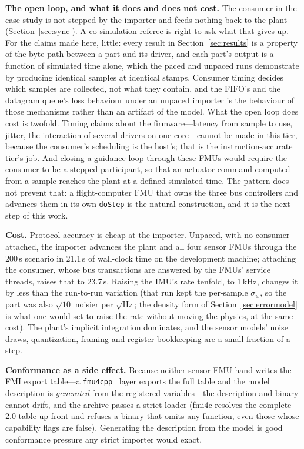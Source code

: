 \documentclass[preprint,12pt,a4paper]{elsarticle}
\newcommand{\code}[1]{\texttt{\small #1}}
\begin{document}
\textbf{The open loop, and what it does and does not cost.} The consumer in
the case study is not stepped by the importer and feeds nothing back to the
plant (Section~\ref{sec:sync}). A co-simulation referee is right to ask what
that gives up. For the claims made here, little: every result in
Section~\ref{sec:results} is a property of the byte path between a part and its
driver, and each part's output is a function of simulated time alone, which the
paced and unpaced runs demonstrate by producing identical samples at identical
stamps. Consumer timing decides which samples are collected, not what they
contain, and the FIFO's and the datagram queue's loss behaviour under an
unpaced importer is the behaviour of those mechanisms rather than an artifact
of the model. What the open loop does cost is twofold. Timing claims about the
firmware---latency from sample to use, jitter, the interaction of several
drivers on one core---cannot be made in this tier, because the consumer's
scheduling is the host's; that is the instruction-accurate tier's job. And
closing a guidance loop through these FMUs would require the consumer to be a
stepped participant, so that an actuator command computed from a sample reaches
the plant at a defined simulated time. The pattern does not prevent that: a
flight-computer FMU that owns the three bus controllers and advances them in
its own \code{doStep} is the natural construction, and it is the next step of
this work.

\textbf{Cost.} Protocol accuracy is cheap at the importer. Unpaced, with no
consumer attached, the importer advances the plant and all four sensor FMUs
through the 200\,s scenario in 21.1\,s of wall-clock time on the development
machine; attaching the consumer, whose bus transactions are answered by the
FMUs' service threads, raises that to 23.7\,s. Raising the IMU's rate tenfold,
to 1\,kHz, changes it by less than the run-to-run variation (that run kept the
per-sample $\sigma_w$, so the part was also $\sqrt{10}$ noisier per
$\sqrt{\text{Hz}}$; the density form of Section~\ref{sec:errormodel} is what
one would set to raise the rate without moving the physics, at the same cost).
The plant's implicit integration dominates, and the sensor models' noise draws,
quantization, framing and register bookkeeping are a small fraction of a step.

\textbf{Conformance as a side effect.} Because neither sensor FMU hand-writes
the FMI export table---a \code{fmu4cpp}~\cite{fmu4cpp} layer exports the full
table and the model description is \emph{generated} from the registered
variables---the description and binary cannot drift, and the archive passes a
strict loader (fmi4c resolves the complete 2.0 table up front and refuses a
binary that omits any function, even those whose capability flags are false).
Generating the description from the model is good conformance pressure any strict
importer would exact.
\end{document}
